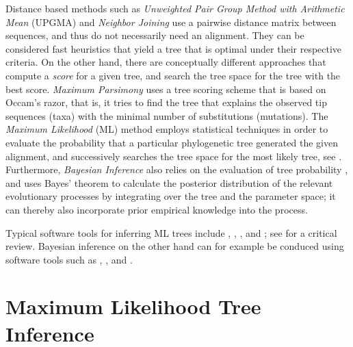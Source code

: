 Distance based methods such as \emph{Unweighted Pair Group Method with Arithmetic Mean} (UPGMA) \cite{Sokal1958}
and \emph{Neighbor Joining} \cite{Saitou1987}
use a pairwise distance matrix between sequences, and thus do not necessarily need an alignment.
They can be considered fast heuristics that yield a tree that is optimal under their respective criteria.
On the other hand, there are conceptually different approaches that compute a \emph{score} for a given tree,
and search the tree space for the tree with the best score.
\emph{Maximum Parsimony} \cite{Sankoff1975} uses a tree scoring scheme that is based on Occam's razor,
that is, it tries to find the tree that explains the observed tip sequences (taxa)
with the minimal number of substitutions (mutations).
The \emph{Maximum Likelihood} (ML) method \cite{Felsenstein1981} employs statistical techniques
in order to evaluate the probability that a particular phylogenetic tree generated the given alignment,
and successively searches the tree space for the most likely tree, see .
Furthermore, \emph{Bayesian Inference} also relies on the evaluation of tree probability \cite{Yang2006},
and uses Bayes' theorem to calculate the posterior distribution of the relevant evolutionary processes
by integrating over the tree and the parameter space;
it can thereby also incorporate prior empirical knowledge into the process.

Typical software tools for inferring ML trees include  \cite{Nguyen2015a},
 \cite{Price2010},  \cite{Zwickl2006}, and  \cite{Stamatakis2014,Kozlov2018a};
see  for a critical review.
Bayesian inference on the other hand can for example be conduced using software tools such as
 \cite{Suchard2018},  \cite{Ronquist2003}, and  \cite{Aberer2014}.


\section{Maximum Likelihood Tree Inference}
\label{ch:Foundations:sec:MLTreeInference}

